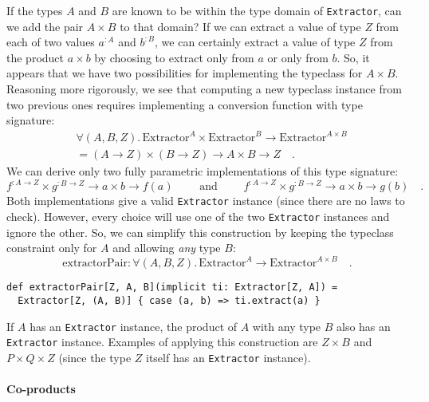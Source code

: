 If the types $A$ and $B$ are known to be within the type domain
of \lstinline!Extractor!, can we add the pair $A\times B$ to that
domain? If we can extract a value of type $Z$ from each of two values
$a^{:A}$ and $b^{:B}$, we can certainly extract a value of type
$Z$ from the product $a\times b$ by choosing to extract only from
$a$ or only from $b$. So, it appears that we have two possibilities
for implementing the typeclass for $A\times B$. Reasoning more rigorously,
we see that computing a new typeclass instance from two previous ones
requires implementing a conversion function with type signature:
\begin{align*}
 & \forall(A,B,Z).\,\text{Extractor}^{A}\times\text{Extractor}^{B}\rightarrow\text{Extractor}^{A\times B}\\
 & =\left(A\rightarrow Z\right)\times\left(B\rightarrow Z\right)\rightarrow A\times B\rightarrow Z\quad.
\end{align*}
We can derive only two fully parametric implementations of this type
signature: 
\[
f^{:A\rightarrow Z}\times g^{:B\rightarrow Z}\rightarrow a\times b\rightarrow f(a)\quad\quad\text{ and }\quad\quad f^{:A\rightarrow Z}\times g^{:B\rightarrow Z}\rightarrow a\times b\rightarrow g(b)\quad.
\]
Both implementations give a valid \lstinline!Extractor! instance
(since there are no laws to check). However, every choice will use
one of the two \lstinline!Extractor! instances and ignore the other.
So, we can simplify this construction by keeping the typeclass constraint
only for $A$ and allowing \emph{any} type $B$:
\[
\text{extractorPair}:\forall(A,B,Z).\,\text{Extractor}^{A}\rightarrow\text{Extractor}^{A\times B}\quad.
\]
\begin{lstlisting}
def extractorPair[Z, A, B](implicit ti: Extractor[Z, A]) =
  Extractor[Z, (A, B)] { case (a, b) => ti.extract(a) }
\end{lstlisting}
If $A$ has an \lstinline!Extractor! instance, the product of $A$
with any type $B$ also has an \lstinline!Extractor! instance. Examples
of applying this construction are $Z\times B$ and $P\times Q\times Z$
(since the type $Z$ itself has an \lstinline!Extractor! instance).

\paragraph{Co-products}

